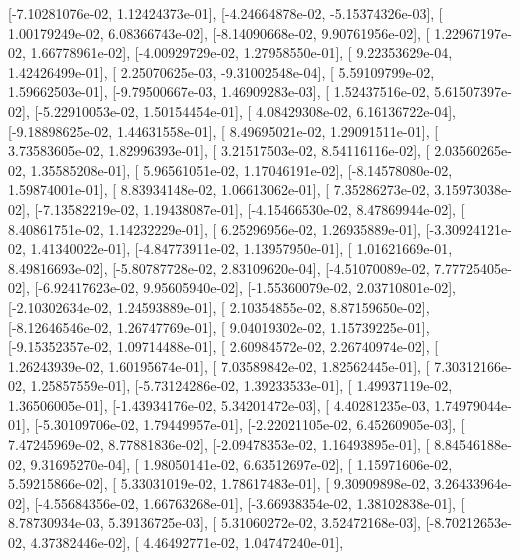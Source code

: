 \documentclass{article}
\begin{document}
       [-7.10281076e-02,  1.12424373e-01],
       [-4.24664878e-02, -5.15374326e-03],
       [ 1.00179249e-02,  6.08366743e-02],
       [-8.14090668e-02,  9.90761956e-02],
       [ 1.22967197e-02,  1.66778961e-02],
       [-4.00929729e-02,  1.27958550e-01],
       [ 9.22353629e-04,  1.42426499e-01],
       [ 2.25070625e-03, -9.31002548e-04],
       [ 5.59109799e-02,  1.59662503e-01],
       [-9.79500667e-03,  1.46909283e-03],
       [ 1.52437516e-02,  5.61507397e-02],
       [-5.22910053e-02,  1.50154454e-01],
       [ 4.08429308e-02,  6.16136722e-04],
       [-9.18898625e-02,  1.44631558e-01],
       [ 8.49695021e-02,  1.29091511e-01],
       [ 3.73583605e-02,  1.82996393e-01],
       [ 3.21517503e-02,  8.54116116e-02],
       [ 2.03560265e-02,  1.35585208e-01],
       [ 5.96561051e-02,  1.17046191e-02],
       [-8.14578080e-02,  1.59874001e-01],
       [ 8.83934148e-02,  1.06613062e-01],
       [ 7.35286273e-02,  3.15973038e-02],
       [-7.13582219e-02,  1.19438087e-01],
       [-4.15466530e-02,  8.47869944e-02],
       [ 8.40861751e-02,  1.14232229e-01],
       [ 6.25296956e-02,  1.26935889e-01],
       [-3.30924121e-02,  1.41340022e-01],
       [-4.84773911e-02,  1.13957950e-01],
       [ 1.01621669e-01,  8.49816693e-02],
       [-5.80787728e-02,  2.83109620e-04],
       [-4.51070089e-02,  7.77725405e-02],
       [-6.92417623e-02,  9.95605940e-02],
       [-1.55360079e-02,  2.03710801e-02],
       [-2.10302634e-02,  1.24593889e-01],
       [ 2.10354855e-02,  8.87159650e-02],
       [-8.12646546e-02,  1.26747769e-01],
       [ 9.04019302e-02,  1.15739225e-01],
       [-9.15352357e-02,  1.09714488e-01],
       [ 2.60984572e-02,  2.26740974e-02],
       [ 1.26243939e-02,  1.60195674e-01],
       [ 7.03589842e-02,  1.82562445e-01],
       [ 7.30312166e-02,  1.25857559e-01],
       [-5.73124286e-02,  1.39233533e-01],
       [ 1.49937119e-02,  1.36506005e-01],
       [-1.43934176e-02,  5.34201472e-03],
       [ 4.40281235e-03,  1.74979044e-01],
       [-5.30109706e-02,  1.79449957e-01],
       [-2.22021105e-02,  6.45260905e-03],
       [ 7.47245969e-02,  8.77881836e-02],
       [-2.09478353e-02,  1.16493895e-01],
       [ 8.84546188e-02,  9.31695270e-04],
       [ 1.98050141e-02,  6.63512697e-02],
       [ 1.15971606e-02,  5.59215866e-02],
       [ 5.33031019e-02,  1.78617483e-01],
       [ 9.30909898e-02,  3.26433964e-02],
       [-4.55684356e-02,  1.66763268e-01],
       [-3.66938354e-02,  1.38102838e-01],
       [ 8.78730934e-03,  5.39136725e-03],
       [ 5.31060272e-02,  3.52472168e-03],
       [-8.70212653e-02,  4.37382446e-02],
       [ 4.46492771e-02,  1.04747240e-01],
\end{document}
